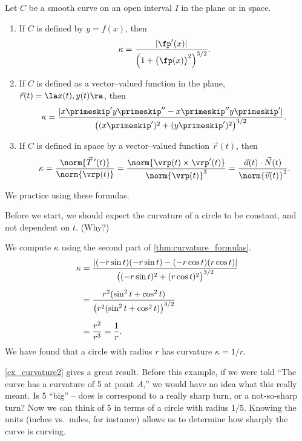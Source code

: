 {Let $C$ be a smooth curve on an open interval $I$ in the plane or in space.
\begin{enumerate}
	\item If $C$ is defined by $y=f(x)$, then 
	$$\kappa = \frac{|\fp'(x)|}{\Big(1+\big(\fp(x)\big)^2\Big)^{3/2}}.$$
	\item	If $C$ is defined as a vector--valued function in the plane, $\vec r(t) = \la x(t), y(t)\ra$, then
	$$\kappa = \frac{|x\primeskip'y\primeskip''-x\primeskip''y\primeskip'|}{\big((x\primeskip')^2+(y\primeskip')^2\big)^{3/2}}.$$
	\item If $C$ is defined in space by a vector--valued function $\vec r(t)$, then
$$\kappa = \frac{\norm{\vec T\,'(t)}}{\norm{\vrp(t)}} = \frac{\norm{\vrp(t)\times\vrp'(t)}}{\norm{\vrp(t)}^3} = \frac{\vec a(t)\cdot \vec N(t)}{\norm{\vec v(t)}^2}.$$
\end{enumerate}}

We practice using these formulas.

{Before we start, we should expect the curvature of a circle to be constant, and not dependent on $t$. (Why?)

We compute $\kappa$ using the second part of \autoref{thm:curvature_formulas}.
\begin{align*}
\kappa &= \frac{|(-r\sin t)(-r\sin t) - (-r\cos t)(r\cos t)|}{\big( (-r\sin t)^2+(r\cos t)^2\big)^{3/2}} \\
			&= \rule{0pt}{20pt}\frac{r^2(\sin^2t+\cos^2t)}{\big(r^2(\sin^2t+\cos^2t)\big)^{3/2}}\\
			&= \rule{0pt}{20pt}\frac{r^2}{r^3} = \frac1r.
\end{align*}
We have found that a circle with radius $r$ has curvature $\kappa = 1/r$.}

\autoref{ex_curvature2} gives a great result. Before this example, if we were told ``The curve has a curvature of 5 at point $A$,'' we would have no idea what this really meant. Is 5 ``big'' -- does is correspond to a really sharp turn, or a not-so-sharp turn? Now we can think of 5 in terms of a circle with radius 1/5. Knowing the units (inches vs.\ miles, for instance) allows us to determine how sharply the curve is curving.\bigskip

